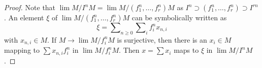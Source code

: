 \documentclass[10pt,a4paper]{amsart}
\theoremstyle{plain}
\theoremstyle{definition}
\theoremstyle{remark}
\numberwithin{equation}{subsection}
\def\lim{\mathop{\mathrm{lim}}\nolimits}
\begin{document}
\begin{proof}
Note that $\lim M/I^nM = \lim M/(f_1^n, \ldots, f_r^n)M$ as
$I^n \supset (f_1^n, \ldots, f_r^n) \supset I^{rn}$.
An element $\xi$ of $\lim M/(f_1^n, \ldots, f_r^n)M$ can be symbolically
written as
$$
\xi = \sum\nolimits_{n \geq 0} \sum\nolimits_i f_i^n x_{n, i}
$$
with $x_{n, i} \in M$. If $M \to \lim M/f_i^nM$ is surjective, then there is
an $x_i \in M$ mapping to $\sum x_{n, i} f_i^n$ in $\lim M/f_i^nM$.
Then $x = \sum x_i$ maps to $\xi$ in $\lim M/I^nM$.
\end{proof}
\end{document}
